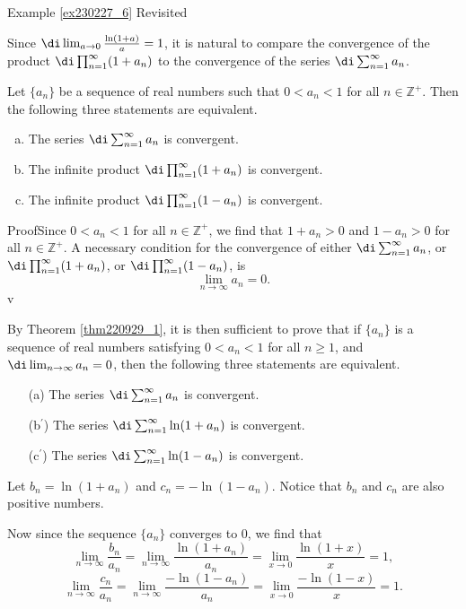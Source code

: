 \begin{example}{\linkt Example \ref{ex230227_6} Revisited}
\begin{example}[label=ex230227_13]{}
Since 
$\di \lim_{a\rightarrow 0}\frac{\ln(1+a)}{ a}=1$,
 it is natural to compare the convergence of the product $\di\prod_{n=1}^{\infty}(1+a_n)$ to the convergence of the series $\di\sum_{n=1}^{\infty}a_n$.  
\begin{theorem}[label=thm220929_2]{}
Let $\{a_n\}$ be a sequence of   real numbers such that $0<a_n<1$ for all $n\in\mathbb{Z}^+$. Then the following three statements are equivalent.
\begin{enumerate}[(a)]
\item  The series $\di \sum_{n=1}^{\infty}a_n$ is convergent.
\item The infinite product $\di\prod_{n=1}^{\infty}(1+a_n)$ is convergent.
\item The infinite product $\di\prod_{n=1}^{\infty}(1-a_n)$ is convergent.
\end{enumerate}
\end{theorem}

\begin{myproof}{Proof}Since $0<a_n<1$ for all $n\in\mathbb{Z}^+$, we find that $1+a_n>0$ and $1-a_n>0$ for all $n\in\mathbb{Z}^+$. A necessary condition for the convergence of either $\di \sum_{n=1}^{\infty}a_n$, or $\di\prod_{n=1}^{\infty}(1+a_n)$, or $\di\prod_{n=1}^{\infty}(1-a_n)$, is
\[\lim_{n\to\infty}a_n=0.\]
v

By Theorem \ref{thm220929_1}, it is then sufficient to prove that if $\{a_n\}$ is a sequence of real numbers satisfying $0< a_n<1$ for all $n\geq 1$, and $\di\lim_{n\rightarrow\infty}a_n=0$, then
the following three statements are equivalent.  
\begin{enumerate}
\item[(a)]  The series $\di \sum_{n=1}^{\infty}a_n$ is convergent.
\item[(b$^{\prime}$)] The series $\di\sum_{n=1}^{\infty}\ln(1+a_n)$ is convergent.
\item[(c$^{\prime}$)] The series $\di\sum_{n=1}^{\infty}\ln(1-a_n)$ is convergent.
\end{enumerate}\bp
Let $b_n=\ln(1+a_n)$ and $c_n=-\ln(1-a_n)$. Notice that $b_n$ and $c_n$ are also positive numbers.

Now since the sequence $\{a_n\}$ converges to 0, we find that
\[\lim_{n\rightarrow\infty}\frac{b_n}{a_n}=\lim_{n\rightarrow\infty}\frac{\ln(1+a_n)}{a_n}=\lim_{x\rightarrow 0}\frac{\ln(1+x)}{x}=1,\]
\[\lim_{n\rightarrow\infty}\frac{c_n}{a_n}=\lim_{n\rightarrow\infty}\frac{-\ln(1-a_n)}{a_n}=\lim_{x\rightarrow 0}\frac{-\ln(1-x)}{x}=1.\]


\end{myproof}
\end{example}
\end{example}
